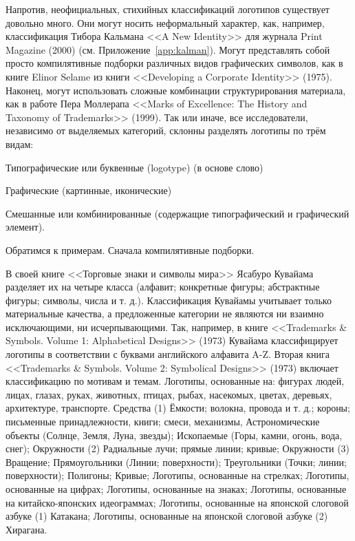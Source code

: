 Напротив, неофициальных, стихийных классификаций логотипов существует довольно много. Они могут
носить неформальный характер, как, например, классификация Тибора Кальмана <<A New Identity>> для
журнала Print Magazine (2000) (см. Приложение~\ref{app:kalman}). Могут представлять собой
просто компилятивные подборки различных
видов графических символов, как в книге Elinor Selame из книги <<Developing a Corporate Identity>>
(1975). Наконец, могут использовать сложные комбинации структурирования материала, как в работе Пера
Моллерапа <<Marks of Excellence: The History and Taxonomy of Trademarks>> (1999). Так или иначе, все
исследователи, независимо от выделяемых категорий, склонны разделять логотипы по трём видам:
\begin{enumerate*}[label=\arabic*)]
\item Типографические или буквенные (logotype) (в основе слово)
\item Графические (картинные, иконические)
\item Смешанные или комбинированные (содержащие типографический и графический элемент).
\end{enumerate*}

Обратимся к примерам. Сначала компилятивные подборки.

В своей книге <<Торговые знаки и символы мира>> Ясабуро Кувайама разделяет их на четыре класса
(алфавит; конкретные фигуры; абстрактные фигуры; символы, числа и т. д.). Классификация Кувайамы
учитывает только материальные качества, а предложенные категории не являются ни взаимно
исключающими, ни исчерпывающими. Так, например, в книге <<Trademarks \& Symbols. Volume 1:
Alphabetical Designs>> (1973) Кувайама классифицирует логотипы в соответствии с буквами английского
алфавита A-Z. \autocite[][5]{kuwayama1973alphabetical}
Вторая книга <<Trademarks \& Symbols. Volume 2: Symbolical Designs>> (1973) включает
классификацию по мотивам и темам. \autocite[][5]{kuwayama1973trademarks}
Логотипы, основанные на: фигурах людей, лицах, глазах, руках, животных, птицах, рыбах, насекомых,
цветах, деревьях, архитектуре, транспорте. Средства (1) Ёмкости; волокна, провода и т. д.; короны;
письменные принадлежности, книги; смеси, механизмы, Астрономические объекты (Солнце, Земля, Луна,
звезды); Ископаемые (Горы, камни, огонь, вода, снег); Окружности (2) Радиальные лучи; прямые линии;
кривые; Окружности (3) Вращение; Прямоугольники (Линии; поверхности); Треугольники (Точки; линии;
поверхности); Полигоны; Кривые; Логотипы, основанные на стрелках; Логотипы, основанные на цифрах;
Логотипы, основанные на знаках; Логотипы, основанные на китайско-японских идеограммах; Логотипы,
основанные на японской слоговой азбуке (1) Катакана; Логотипы, основанные на японской слоговой
азбуке (2) Хирагана.

